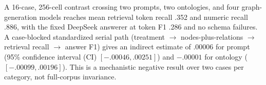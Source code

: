 A 16-case, 256-cell contrast crossing two prompts, two ontologies, and four graph-generation models reaches mean retrieval token recall .352 and numeric recall .886, with the fixed DeepSeek answerer at token F1 .286 and no schema failures. A case-blocked standardized serial path (treatment $\rightarrow$ nodes-plus-relations $\rightarrow$ retrieval recall $\rightarrow$ answer F1) gives an indirect estimate of $.00006$ for prompt (95\% confidence interval (CI) $[-.00046,.00251]$) and $-.00001$ for ontology ($[-.00099,.00196]$). This is a mechanistic negative result over two cases per category, not full-corpus invariance.
